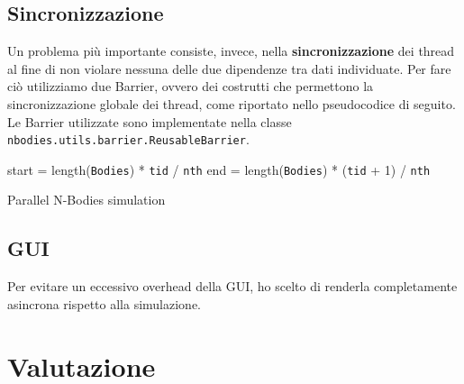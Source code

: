 \documentclass[12pt,a4paper,oneside]{article}
\begin{document}
	\subsection{Sincronizzazione}
	Un problema più importante consiste, invece, nella \textbf{sincronizzazione} dei thread al fine di non violare nessuna delle due dipendenze tra dati individuate. Per fare ciò utilizziamo due Barrier, ovvero dei costrutti che permettono la sincronizzazione globale dei thread, come riportato nello pseudocodice di seguito. Le Barrier utilizzate sono implementate nella classe \texttt{nbodies.utils.barrier.ReusableBarrier}.
	
	\begin{algorithm}
		
		start = length(\texttt{Bodies}) * \texttt{tid} / \texttt{nth}\;
		end = length(\texttt{Bodies}) * (\texttt{tid} + 1) / \texttt{nth}\;
		\caption{Parallel N-Bodies simulation}
		\label{alg:sim-barrier}
	\end{algorithm}

	\subsection{GUI}
	Per evitare un eccessivo overhead della GUI, ho scelto di renderla completamente asincrona rispetto alla simulazione.
	
	\section{Valutazione}
\end{document}
